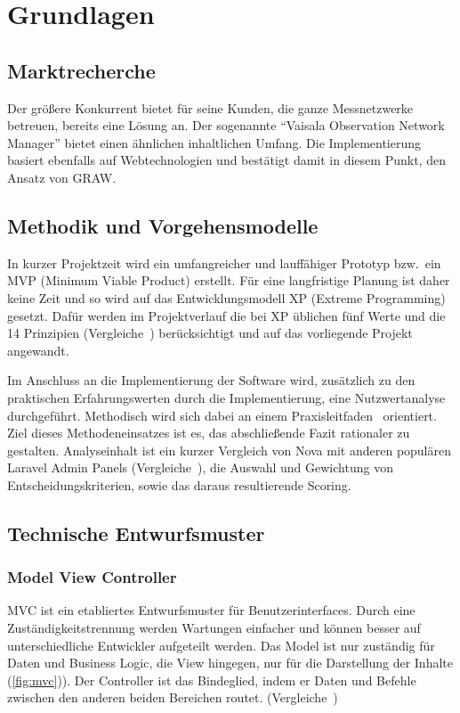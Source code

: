 \section{Grundlagen}

\subsection{Marktrecherche}
Der größere Konkurrent bietet für seine Kunden, die ganze Messnetzwerke betreuen, bereits eine Lösung an.
Der sogenannte \enquote{Vaisala Observation Network Manager}\cite{observation-network-manager} bietet einen ähnlichen inhaltlichen Umfang.
Die Implementierung basiert ebenfalls auf Webtechnologien und bestätigt damit in diesem Punkt, den Ansatz von GRAW.

\subsection{Methodik und Vorgehensmodelle}
In kurzer Projektzeit wird ein umfangreicher und lauffähiger Prototyp bzw.\ ein MVP (Minimum Viable Product) erstellt.
Für eine langfristige Planung ist daher keine Zeit und so wird auf das Entwicklungsmodell XP (Extreme Programming) gesetzt.
Dafür werden im Projektverlauf die bei XP üblichen fünf Werte und die 14 Prinzipien (Vergleiche~\cite{agile-prozesse}) berücksichtigt und auf das vorliegende Projekt angewandt.

Im Anschluss an die Implementierung der Software wird, zusätzlich zu den praktischen Erfahrungswerten durch die Implementierung, eine Nutzwertanalyse durchgeführt.
Methodisch wird sich dabei an einem Praxisleitfaden~\cite{scoring-und-nutzwertanalysen} orientiert.
Ziel dieses Methodeneinsatzes ist es, das abschließende Fazit rationaler zu gestalten.
Analyseinhalt ist ein kurzer Vergleich von Nova mit anderen populären Laravel Admin Panels (Vergleiche~\cite{the-guide-to-laravel-admin-panels}), die Auswahl und Gewichtung von Entscheidungskriterien, sowie das daraus resultierende Scoring.

\subsection{Technische Entwurfsmuster}

\subsubsection{Model View Controller}
MVC ist ein etabliertes Entwurfsmuster für Benutzerinterfaces.
Durch eine Zuständigkeitstrennung werden Wartungen einfacher und können besser auf unterschiedliche Entwickler aufgeteilt werden.
Das Model ist nur zuständig für Daten und Business Logic, die View hingegen, nur für die Darstellung der Inhalte (\ref{fig:mvc})).
Der Controller ist das Bindeglied, indem er Daten und Befehle zwischen den anderen beiden Bereichen routet.
(Vergleiche~\cite{mdn-glossary-mvc})


